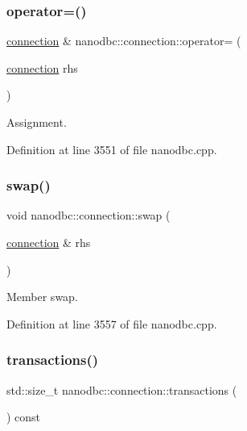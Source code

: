 \mbox{\label{classnanodbc_1_1connection_a47debf67d31d195f307bbc52b650cdf2}} 
\subsubsection{\texorpdfstring{operator=()}{operator=()}}
{\footnotesize\ttfamily \mbox{\hyperlink{classnanodbc_1_1connection}{connection}} \& nanodbc\+::connection\+::operator= (\begin{DoxyParamCaption}\item[{\mbox{\hyperlink{classnanodbc_1_1connection}{connection}}}]{rhs }\end{DoxyParamCaption})}



Assignment. 



Definition at line 3551 of file nanodbc.\+cpp.

\mbox{\label{classnanodbc_1_1connection_ab241b93c73d166570d6cc897c533c251}} 
\subsubsection{\texorpdfstring{swap()}{swap()}}
{\footnotesize\ttfamily void nanodbc\+::connection\+::swap (\begin{DoxyParamCaption}\item[{\mbox{\hyperlink{classnanodbc_1_1connection}{connection}} \&}]{rhs }\end{DoxyParamCaption})\hspace{0.3cm}{\ttfamily [noexcept]}}



Member swap. 



Definition at line 3557 of file nanodbc.\+cpp.

\mbox{\label{classnanodbc_1_1connection_ae242ce62a62d14e7fc0e8c741838d258}} 
\subsubsection{\texorpdfstring{transactions()}{transactions()}}
{\footnotesize\ttfamily std\+::size\+\_\+t nanodbc\+::connection\+::transactions (\begin{DoxyParamCaption}{ }\end{DoxyParamCaption}) const}



